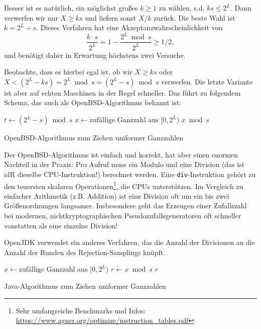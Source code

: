 Besser ist es natürlich, ein möglichst großes $k \ge 1$ zu wählen, s.d. $k s \le 2^L$.
Dann verwerfen wir nur $X \ge ks$ und liefern sonst $X / k$ zurück.
Die beste Wahl ist $k = 2^L \div s$.
Dieses Verfahren hat eine Akzeptanzwahrscheinlichkeit von
\begin{equation}
    \frac{k \cdot s}{2^L} = 1 - \frac{2^L \bmod s}{2^L} \ge 1/2,
\end{equation}
und benötigt daher in Erwartung höchstens zwei Versuche.

Beobachte, dass es hierbei egal ist, ob wir $X \ge ks$ oder $X < (2^L - ks) = 2^L \bmod s = (2^L -s) \bmod s$ verwerfen.
Die letzte Variante ist aber auf echten Maschinen in der Regel schneller.
Das führt zu folgendem Schema, das auch als OpenBSD-Algorithmus bekannt ist:

\begin{algorithm}[H]
    $t \gets (2^L - s) \bmod s$
    $x \gets \text{zufällige Ganzzahl aus $[0, 2^L)$}$\;
    \While{$x < t$}{
        $x \gets \text{zufällige Ganzzahl aus $[0, 2^L)$}$\;
    }
    \Return $x \bmod s$\;
    \caption{OpenBSD-Algorithmus zum Ziehen uniformer Ganzzahlen}
\end{algorithm}

Der OpenBSD-Algorithmus ist einfach und korrekt, hat aber einen enormen Nachteil in der Praxis:
Pro Aufruf muss ein Modulo und eine Division (das ist idR dieselbe CPU-Instruktion!) berechnet werden.
Eine \texttt{div}-Instruktion gehört zu den teuersten skalaren Operationen\footnote{Sehr umfangreiche Benchmarks und Infos: \url{https://www.agner.org/optimize/instruction_tables.pdf}}, die CPUs unterstützen.
Im Vergleich zu einfacher Arithmetik (z.B. Addition) ist eine Division oft um ein bis zwei Größenordnungen langsamer.
Insbesondere geht das Erzeugen einer Zufallszahl bei modernen, nichtkryptographischen Pseudozufallsgeneratoren oft schneller vonstatten als eine einzelne Division!

OpenJDK verwendet ein anderes Verfahren, das die Anzahl der Divisionen an die Anzahl der Runden des Rejection-Samplings knüpft.

\begin{algorithm}[H]
    $x \gets \text{zufällige Ganzzahl aus $[0, 2^L)$}$\;
    $r \gets x \bmod s$\;
    \While{$x - r > 2^L - s$}{
    	$x \gets \text{zufällige Ganzzahl aus $[0, 2^L)$}$\;
    	$r \gets x \bmod s$\;
    }
    \Return $r$\;
    \caption{Java-Algorithmus zum Ziehen uniformer Ganzzahlen}
\end{algorithm}

